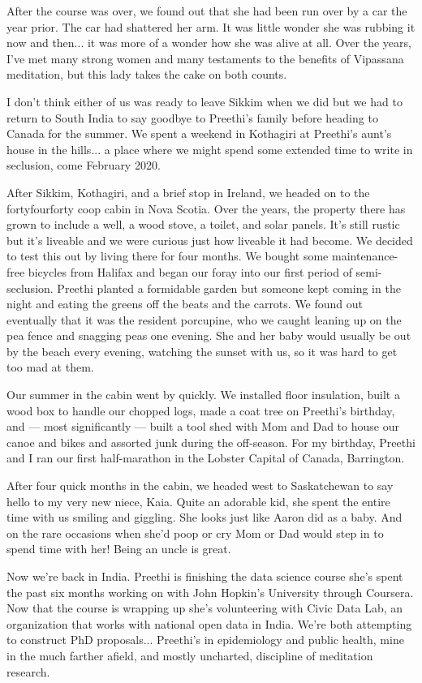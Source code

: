 \documentclass{article}
\begin{document}
After the course was over, we found out that she had been run over by a car the year
prior. The car had shattered her arm. It was little wonder she was rubbing it now and
then... it was more of a wonder how she was alive at all. Over the years, I've
met many strong women and many testaments to the benefits of Vipassana meditation,
but this lady takes the cake on both counts.

I don't think either of us was ready to leave Sikkim when we did but we had to return
to South India to say goodbye to Preethi's family before heading to Canada for the
summer. We spent a weekend in Kothagiri at Preethi's aunt's house in the hills... a
place where we might spend some extended time to write in seclusion, come February 2020.

After Sikkim, Kothagiri, and a brief stop in Ireland, we headed on to the fortyfourforty coop cabin in Nova
Scotia. Over the years, the property there has grown to include a well, a wood stove,
a toilet, and solar panels. It's still rustic but it's liveable and we were curious
just how liveable it had become. We decided to test this out by living there for four
months. We bought some maintenance-free bicycles from Halifax and began our foray
into our first period of semi-seclusion. Preethi planted a formidable garden but
someone kept coming in the night and eating the greens off the beats and the
carrots. We found out eventually that it was the resident porcupine, who we caught
leaning up on the pea fence and snagging peas one evening. She and her baby would
usually be out by the beach every evening, watching the sunset with us, so it was hard to get too
mad at them.

Our summer in the cabin went by quickly. We installed floor insulation, built a wood
box to handle our chopped logs, made a coat tree on Preethi's birthday, and --- most
significantly --- built a tool shed with Mom and Dad to house our canoe and bikes and assorted junk
during the off-season. For my birthday, Preethi and I ran our first half-marathon in
the Lobster Capital of Canada, Barrington.

After four quick months in the cabin, we headed west to Saskatchewan to say hello to
my very new niece, Kaia. Quite an adorable kid, she spent the entire time with us
smiling and giggling. She looks just like Aaron did as a baby. And on the rare
occasions when she'd poop or cry Mom or Dad
would step in to spend time with her! Being an uncle is great.

Now we're back in India. Preethi is finishing the data science course she's spent the
past six months working on with John Hopkin's University through Coursera. Now that the course
is wrapping up she's volunteering with Civic Data Lab, an
organization that works with national open data in India. We're both attempting to
construct PhD proposals... Preethi's in epidemiology and public health, mine in the
much farther afield, and mostly uncharted, discipline of meditation research.
\end{document}
